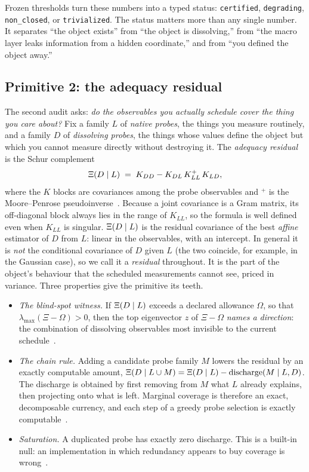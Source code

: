 Frozen thresholds turn these numbers into a typed status: \texttt{certified}, \texttt{degrading}, \texttt{non\_closed}, or \texttt{trivialized}. The status matters more than any single number. It separates ``the object exists'' from ``the object is dissolving,'' from ``the macro layer leaks information from a hidden coordinate,'' and from ``you defined the object away.''

\subsection{Primitive 2: the adequacy residual}
\label{sec:sbt-xi}

The second audit asks: \emph{do the observables you actually schedule cover the thing you care about?} Fix a family $L$ of \emph{native probes}, the things you measure routinely, and a family $D$ of \emph{dissolving probes}, the things whose values define the object but which you cannot measure directly without destroying it. The \emph{adequacy residual} is the Schur complement
\begin{equation}
\Xi(D \mid L) \;=\; K_{DD} - K_{DL}\,K_{LL}^{+}\,K_{LD},
\label{eq:xi}
\end{equation}
where the $K$ blocks are covariances among the probe observables and ${}^{+}$ is the Moore--Penrose pseudoinverse~\cite{sbt-xi}. Because a joint covariance is a Gram matrix, its off-diagonal block always lies in the range of $K_{LL}$, so the formula is well defined even when $K_{LL}$ is singular. $\Xi(D \mid L)$ is the residual covariance of the best \emph{affine} estimator of $D$ from $L$: linear in the observables, with an intercept. In general it is \emph{not} the conditional covariance of $D$ given $L$ (the two coincide, for example, in the Gaussian case), so we call it a \emph{residual} throughout. It is the part of the object's behaviour that the scheduled measurements cannot see, priced in variance. Three properties give the primitive its teeth.

\begin{itemize}
\item \emph{The blind-spot witness.} If $\Xi(D \mid L)$ exceeds a declared allowance $\Omega$, so that $\lambda_{\max}(\Xi - \Omega) > 0$, then the top eigenvector $z$ of $\Xi - \Omega$ \emph{names a direction}: the combination of dissolving observables most invisible to the current schedule~\cite{sbt-xi}.
\item \emph{The chain rule.} Adding a candidate probe family $M$ lowers the residual by an exactly computable amount, $\Xi(D \mid L \cup M) = \Xi(D \mid L) - \mathrm{discharge}(M \mid L, D)$. The discharge is obtained by first removing from $M$ what $L$ already explains, then projecting onto what is left. Marginal coverage is therefore an exact, decomposable currency, and each step of a greedy probe selection is exactly computable~\cite{sbt-xi}.
\item \emph{Saturation.} A duplicated probe has exactly zero discharge. This is a built-in null: an implementation in which redundancy appears to buy coverage is wrong~\cite{sbt-xi}.
\end{itemize}

